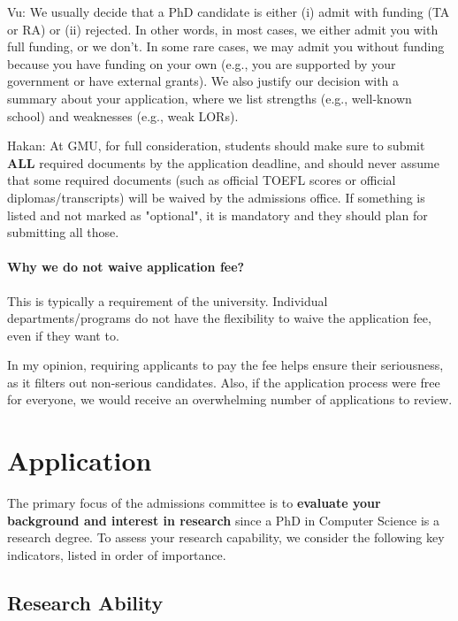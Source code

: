\documentclass[11pt]{article}
\newenvironment{commentbox}{
 \small
    \begin{cbox}
 }{
   \end{cbox}
}
\begin{document}
\begin{commentbox}
Vu: We usually decide that a PhD candidate is either (i) admit with funding (TA or RA) or (ii) rejected. In other words, in most cases, we either
admit you with full funding, or we don't. In some rare cases, we may admit
you without funding because you have funding on your own (e.g., you are
supported by your government or have external grants). We also justify
our decision with a summary about your application, where we list
strengths (e.g., well-known school) and weaknesses (e.g., weak
LORs).
\end{commentbox}

\begin{commentbox}
    Hakan: At GMU, for full consideration, students should make sure to submit \textbf{ALL} required documents by the application deadline, and should never assume that some required documents (such as official TOEFL scores or official diplomas/transcripts) will be waived by the admissions office. If something is listed and not marked as "optional", it is mandatory and they should plan for submitting all those.  
\end{commentbox}
\paragraph{Why we do not waive application fee?}  This is typically a requirement of the university. Individual departments/programs do not have the flexibility to waive the application fee, even if they want to. 

In my opinion, requiring applicants to pay the fee helps ensure their seriousness, as it filters out non-serious candidates. Also, if the application process were free for everyone, we would receive an overwhelming number of applications to review.


\section{Application}\label{sec:application}

The primary focus of the admissions committee is to \textbf{evaluate your background and interest in research} since a PhD in Computer Science
is a research degree. To assess your research capability, we consider
the following key indicators, listed in order of importance.

\subsection{Research Ability}
\end{document}
